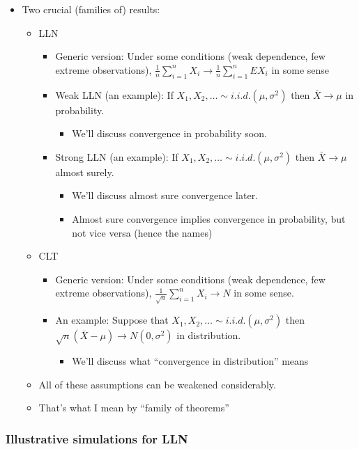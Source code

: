 \documentclass[11pt]{article}
\begin{document}
\begin{itemize}
\item Two crucial (families of) results:
\begin{itemize}
\item LLN
\begin{itemize}
\item Generic version: Under some conditions (weak dependence, few
           extreme observations), 
           $\frac{1}{n} \sum_{i=1}^n X_i \to \frac{1}{n} \sum_{i=1}^n E X_i$
           in some sense
\item Weak LLN (an example): If $X_1,X_2,\dots \sim i.i.d. (\mu,
           \sigma^2)$ then $\bar X \to \mu$ in probability.
\begin{itemize}
\item We'll discuss convergence in probability soon.
\end{itemize}
\item Strong LLN (an example): If $X_1,X_2,\dots \sim i.i.d. (\mu,
           \sigma^2)$ then $\bar X \to \mu$ almost surely.
\begin{itemize}
\item We'll discuss almost sure convergence later.
\item Almost sure convergence implies convergence in
             probability, but not vice versa (hence the names)
\end{itemize}
\end{itemize}
\item CLT
\begin{itemize}
\item Generic version: Under some conditions (weak dependence, few
           extreme observations), $\frac{1}{\sqrt{n}} \sum_{i=1}^n X_i
           \to N$ in some sense.
\item An example: Suppose that $X_1, X_2, \dots \sim i.i.d. (\mu, \sigma^2)$
           then $\sqrt{n}(\bar X - \mu) \to N(0, \sigma^2)$ in distribution.
\begin{itemize}
\item We'll discuss what ``convergence in distribution'' means
\end{itemize}
\end{itemize}
\item All of these assumptions can be weakened considerably.
\item That's what I mean by ``family of theorems''
\end{itemize}
\end{itemize}
\subsubsection{Illustrative simulations for LLN}
\label{sec-1-1-2}
\end{document}
